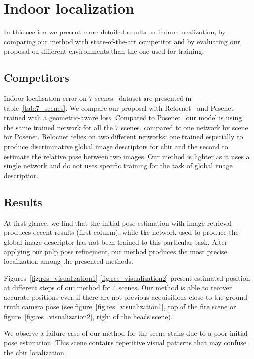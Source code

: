 \section{Indoor localization}
\label{sec:indoor}

In this section we present more detailed results on indoor localization, by comparing our method with state-of-the-art competitor and by evaluating our proposal on different environments than the one used for training.

\subsection{Competitors}
Indoor localisation error on 7 scenes~\citep{Shotton2013} dataset are presented in table~\ref{tab:7_scenes}. We compare our proposal with Relocnet~\citep{Purkait2018} and Posenet~\citep{Kendall2017} trained with a geometric-aware loss. Compared to Posenet~\citep{Kendall2017} our model is using the same trained network for all the 7 scenes, compared to one network by scene for Posenet. Relocnet relies on two different networks: one trained especially to produce discriminative global image descriptors for \ac{cbir} and the second to estimate the relative pose between two images. Our method is lighter as it uses a single network and do not uses specific training for the task of global image description.



\subsection{Results}
At first glance, we find that the initial pose estimation with image retrieval produces decent results (first column), while the network used to produce the global image descriptor has not been trained to this particular task. After applying our \ac{pnlp} pose refinement, our method produces the most precise localization among the presented methods. 

Figures~\ref{fig:res_visualization1}-\ref{fig:res_visualization2} present estimated position at different steps of our method for 4 scenes. Our method is able to recover accurate positions even if there are not previous acquisitions close to the ground truth camera pose (see figure~\ref{fig:res_visualization1}, top of the fire scene or figure~\ref{fig:res_visualization2}, right of the heads scene).

We observe a failure case of our method for the scene stairs due to a poor initial pose estimation. This scene contains repetitive visual patterns that may confuse the \ac{cbir} localization.

